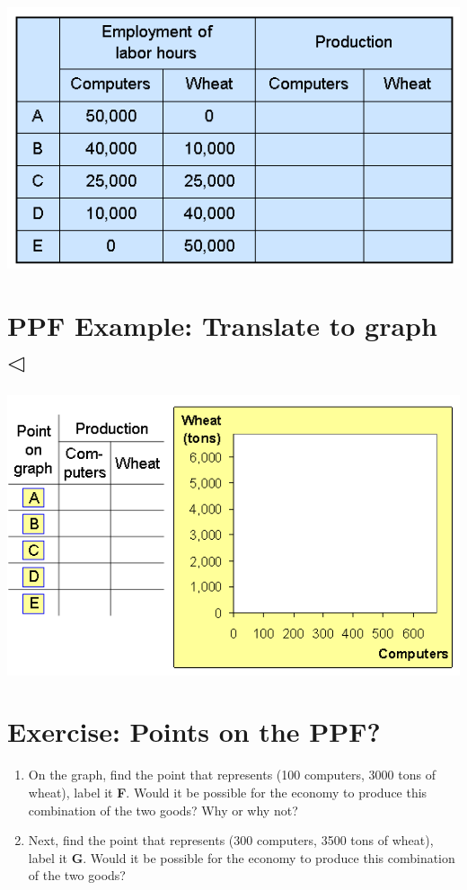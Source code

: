 \documentclass[
]{book}
\begin{document}
\includegraphics[width=\textwidth,height=0.6\textheight]{images/lesson02/page09.PNG}

\hypertarget{ppf-example-translate-to-graph-triangleleft}{%
\section{\texorpdfstring{PPF Example: Translate to graph \(\triangleleft\)}{PPF Example: Translate to graph \textbackslash triangleleft}}\label{ppf-example-translate-to-graph-triangleleft}}

\includegraphics[width=\textwidth,height=0.75\textheight]{images/lesson02/page11.PNG}

\hypertarget{exercise-points-on-the-ppf}{%
\section{Exercise: Points on the PPF?}\label{exercise-points-on-the-ppf}}

\begin{enumerate}
\def\labelenumi{\alph{enumi}.}
\item
  On the graph, find the point that represents (100 computers, 3000 tons of wheat), label it \textbf{F}. Would it be possible for the economy to produce this combination of the two goods? Why or why not?
\item
  Next, find the point that represents (300 computers, 3500 tons of wheat), label it \textbf{G}. Would it be possible for the economy to produce this combination of the two goods?
\end{enumerate}
\end{document}
